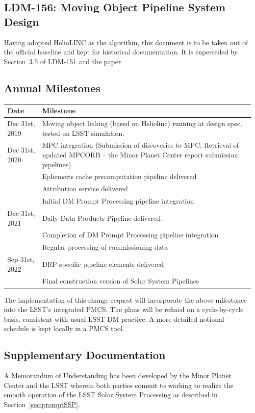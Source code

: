 \documentclass[DM,authoryear,toc,lsstdraft]{lsstdoc}
\begin{document}
\subsection{LDM-156: Moving Object Pipeline System Design}

Having adopted HelioLINC as the algorithm, this document is to be taken out of the official baseline and kept for historical documentation. It is superseded by Section~3.5 of LDM-151 and the \cite{heliolinc} paper.

\subsection{Annual Milestones}

	\begin{tabular}{ p{1.5in}p{4.5in} } 
		\hline
		Date & Milestone \\
		\hline
		\hline
		Dec 31st, 2019 & Moving object linking (based on Heliolinc) running at design spec, tested on LSST simulation. \\ 
		Dec 31st, 2020 & MPC integration (Submission of discoveries to MPC; Retrieval of updated MPCORB -- the Minor Planet Center report submission pipelines). \\
		              & Ephemeris cache precomputation pipeline delivered \\
		              & Attribution service delivered \\
		              & Initial DM Prompt Processing pipeline integration \\
		Dec 31st, 2021 & Daily Data Products Pipeline delivered. \\
		              & Completion of DM Prompt Processing pipeline integration \\
		              & Regular processing of commissioning data \\
		Sep 31st, 2022 & DRP-specific pipeline elements delivered \\
		              & Final construction version of Solar System Pipelines \\
		\hline
	\end{tabular}

The implementation of this change request will incorporate the above milestones into the LSST's integrated PMCS. The plans will be refined on a cycle-by-cycle basis, consistent with usual LSST-DM practice. A more detailed notional schedule is kept locally in a PMCS tool.

\subsection{Supplementary Documentation}

A Memorandum of Understanding has been developed by the Minor Planet Center and the LSST wherein both parties commit to working to realize the smooth operation of the LSST Solar System Processing as described in Section~\ref{sec:promptSSP}.


\end{document}
